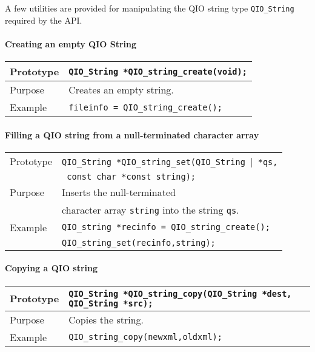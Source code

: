 \documentclass{article}
\newcommand{\QIOstring}{{\tt QIO\_String }}
\begin{document}
 A few utilities are provided for manipulating the QIO string type
\QIOstring required by the API\@.

\paragraph{Creating an empty QIO String}

\begin{flushleft}
  \begin{tabular}{|l|l|}
  \hline
  Prototype      & \QIOstring \verb|*QIO_string_create(void);|\\
    \hline
  Purpose        & Creates an empty string. \\
   \hline
  Example        & \verb|fileinfo = QIO_string_create();| \\
   \hline
 \end{tabular}
\end{flushleft}
%
\paragraph{Filling a QIO string from a null-terminated character array}

\begin{flushleft}
  \begin{tabular}{|l|l|}
  \hline
  Prototype      & \QIOstring \verb|*QIO_string_set(|\QIOstring|\verb| *qs,| \\
                 & \verb| const char *const string);|\\
    \hline
  Purpose        & Inserts the null-terminated \\
                 & character array \verb|string| into the string \verb|qs|. \\
   \hline
  Example        & \verb|QIO_string *recinfo = QIO_string_create();| \\
                 & \verb|QIO_string_set(recinfo,string);| \\
   \hline
 \end{tabular}
\end{flushleft}
%
\paragraph{Copying a QIO string}

\begin{flushleft}
  \begin{tabular}{|l|l|}
  \hline
  Prototype      & \QIOstring \verb|*QIO_string_copy(|\QIOstring \verb|*dest,| \QIOstring \verb|*src);|\\
    \hline
  Purpose        & Copies the string. \\
   \hline
  Example        & \verb|QIO_string_copy(newxml,oldxml);| \\
   \hline
 \end{tabular}
\end{flushleft}
%
\end{document}
